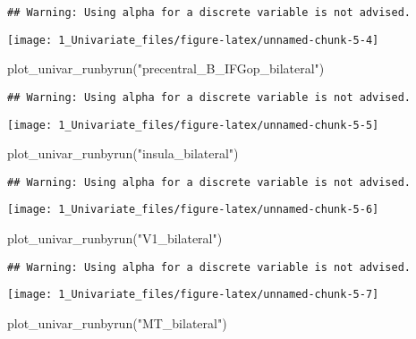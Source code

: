 \documentclass[
]{article}
\newenvironment{Shaded}{\begin{snugshade}}{\end{snugshade}}
\newcommand{\FunctionTok}[1]{\textcolor[rgb]{0.00,0.00,0.00}{#1}}
\newcommand{\NormalTok}[1]{#1}
\newcommand{\StringTok}[1]{\textcolor[rgb]{0.31,0.60,0.02}{#1}}
\begin{document}
\begin{verbatim}
## Warning: Using alpha for a discrete variable is not advised.
\end{verbatim}

\texttt{[image: 1\_Univariate\_files/figure-latex/unnamed-chunk-5-4]}

\begin{Shaded}
\begin{Highlighting}[]
\FunctionTok{plot\_univar\_runbyrun}\NormalTok{(}\StringTok{"precentral\_B\_IFGop\_bilateral"}\NormalTok{)}
\end{Highlighting}
\end{Shaded}

\begin{verbatim}
## Warning: Using alpha for a discrete variable is not advised.
\end{verbatim}

\texttt{[image: 1\_Univariate\_files/figure-latex/unnamed-chunk-5-5]}

\begin{Shaded}
\begin{Highlighting}[]
\FunctionTok{plot\_univar\_runbyrun}\NormalTok{(}\StringTok{"insula\_bilateral"}\NormalTok{)}
\end{Highlighting}
\end{Shaded}

\begin{verbatim}
## Warning: Using alpha for a discrete variable is not advised.
\end{verbatim}

\texttt{[image: 1\_Univariate\_files/figure-latex/unnamed-chunk-5-6]}

\begin{Shaded}
\begin{Highlighting}[]
\FunctionTok{plot\_univar\_runbyrun}\NormalTok{(}\StringTok{"V1\_bilateral"}\NormalTok{)}
\end{Highlighting}
\end{Shaded}

\begin{verbatim}
## Warning: Using alpha for a discrete variable is not advised.
\end{verbatim}

\texttt{[image: 1\_Univariate\_files/figure-latex/unnamed-chunk-5-7]}

\begin{Shaded}
\begin{Highlighting}[]
\FunctionTok{plot\_univar\_runbyrun}\NormalTok{(}\StringTok{"MT\_bilateral"}\NormalTok{)}
\end{Highlighting}
\end{Shaded}
\end{document}

